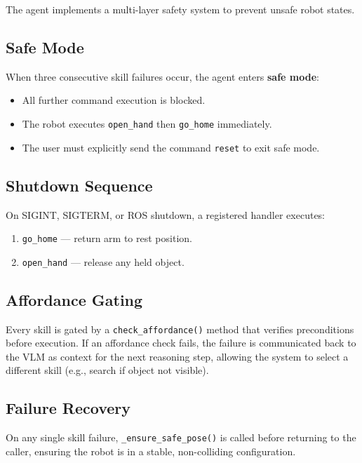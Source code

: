 \documentclass[12pt,a4paper]{report}
\begin{document}
The agent implements a multi-layer safety system to prevent unsafe robot states.

\subsection{Safe Mode}

When three consecutive skill failures occur, the agent enters \textbf{safe mode}:
\begin{itemize}[noitemsep]
  \item All further command execution is blocked.
  \item The robot executes \texttt{open\_hand} then \texttt{go\_home} immediately.
  \item The user must explicitly send the command \texttt{reset} to exit safe mode.
\end{itemize}

\subsection{Shutdown Sequence}

On SIGINT, SIGTERM, or ROS shutdown, a registered handler executes:
\begin{enumerate}[noitemsep]
  \item \texttt{go\_home} — return arm to rest position.
  \item \texttt{open\_hand} — release any held object.
\end{enumerate}

\subsection{Affordance Gating}

Every skill is gated by a \texttt{check\_affordance()} method that verifies
preconditions before execution.  If an affordance check fails, the failure is communicated
back to the VLM as context for the next reasoning step, allowing the system to select
a different skill (e.g., search if object not visible).

\subsection{Failure Recovery}

On any single skill failure, \texttt{\_ensure\_safe\_pose()} is called before returning
to the caller, ensuring the robot is in a stable, non-colliding configuration.
\end{document}
